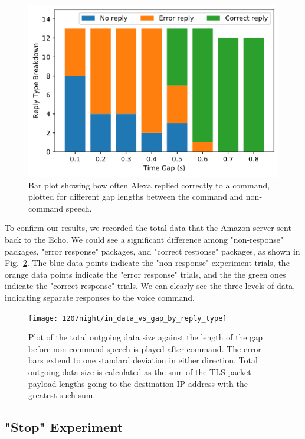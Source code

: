 \begin{figure}[!t]
	\centering
	\includegraphics[scale=0.4]{../measurement/results/1207night/reply_type_breakdown}
	\caption{Bar plot showing how often Alexa replied correctly to a command, plotted for different gap lengths between the command and non-command speech.}
	\label{fig:gap}
	\vspace{-3mm}
	\end{figure}

To confirm our results, we recorded the total data that the Amazon server sent back to the Echo. We could see a significant difference among "non-response" packages, "error response" packages, and "correct response" packages, as shown in Fig.~\ref{fig:postfix_variablegap_sizes}. The blue data points indicate the "non-response" experiment trials, the orange data points indicate the "error response" trials, and the the green ones indicate the "correct response" trials. We can clearly see the three levels of data, indicating separate responses to the voice command.

\begin{figure}[!t]
    \centering
    \texttt{[image: 1207night/in\_data\_vs\_gap\_by\_reply\_type]}
    \caption{Plot of the total outgoing data size against the length of the gap before non-command speech is played after command. The error bars extend to one standard deviation in either direction. Total outgoing data size is calculated as the sum of the TLS packet payload lengths going to the destination IP address with the greatest such sum.}
    \label{fig:postfix_variablegap_sizes}
\end{figure}


\subsection{"Stop" Experiment}

